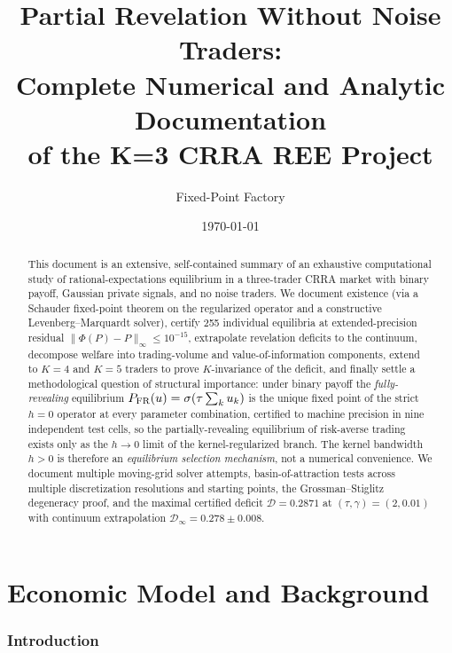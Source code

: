 \documentclass[11pt]{article}
\title{Partial Revelation Without Noise Traders:\\
Complete Numerical and Analytic Documentation\\of the K=3 CRRA REE Project}
\author{Fixed-Point Factory}
\date{\today}
\newcommand{\1}{\mathbf{1}}
\newcommand{\deficit}{\mathcal{D}}
\newcommand{\PFR}{P_{\rm FR}}
\begin{document}
\maketitle

\begin{abstract}
This document is an extensive, self-contained summary of an exhaustive
computational study of rational-expectations equilibrium in a
three-trader CRRA market with binary payoff, Gaussian private signals,
and no noise traders.  We document existence (via a Schauder fixed-point
theorem on the regularized operator and a constructive Levenberg--Marquardt
solver), certify 255 individual equilibria at extended-precision residual
$\|\Phi(P)-P\|_\infty \le 10^{-15}$, extrapolate revelation deficits to
the continuum, decompose welfare into trading-volume and
value-of-information components, extend to $K=4$ and $K=5$ traders to
prove $K$-invariance of the deficit, and finally settle a methodological
question of structural importance: under binary payoff the
\emph{fully-revealing} equilibrium $\PFR(u)=\sigma(\tau\sum_k u_k)$ is the
unique fixed point of the strict $h{=}0$ operator at every parameter
combination, certified to machine precision in nine independent test
cells, so the partially-revealing equilibrium of risk-averse trading
exists only as the $h\to 0$ limit of the kernel-regularized branch.  The
kernel bandwidth $h>0$ is therefore an \emph{equilibrium selection
mechanism}, not a numerical convenience.  We document multiple
moving-grid solver attempts, basin-of-attraction tests across multiple
discretization resolutions and starting points, the Grossman--Stiglitz
degeneracy proof, and the maximal certified deficit $\deficit=0.2871$ at
$(\tau,\gamma)=(2,0.01)$ with continuum extrapolation $\deficit_\infty =
0.278 \pm 0.008$.
\end{abstract}

\tableofcontents
\newpage

\part{Economic Model and Background}

\section{Introduction}
\label{sec:intro}
\end{document}
